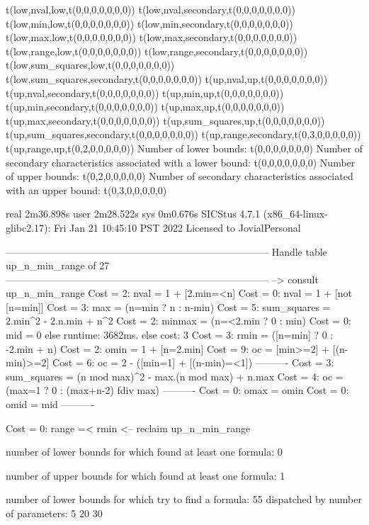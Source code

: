 t(low,nval,low,t(0,0,0,0,0,0,0))
t(low,nval,secondary,t(0,0,0,0,0,0,0))
t(low,min,low,t(0,0,0,0,0,0,0))
t(low,min,secondary,t(0,0,0,0,0,0,0))
t(low,max,low,t(0,0,0,0,0,0,0))
t(low,max,secondary,t(0,0,0,0,0,0,0))
t(low,range,low,t(0,0,0,0,0,0,0))
t(low,range,secondary,t(0,0,0,0,0,0,0))
t(low,sum_squares,low,t(0,0,0,0,0,0,0))
t(low,sum_squares,secondary,t(0,0,0,0,0,0,0))
t(up,nval,up,t(0,0,0,0,0,0,0))
t(up,nval,secondary,t(0,0,0,0,0,0,0))
t(up,min,up,t(0,0,0,0,0,0,0))
t(up,min,secondary,t(0,0,0,0,0,0,0))
t(up,max,up,t(0,0,0,0,0,0,0))
t(up,max,secondary,t(0,0,0,0,0,0,0))
t(up,sum_squares,up,t(0,0,0,0,0,0,0))
t(up,sum_squares,secondary,t(0,0,0,0,0,0,0))
t(up,range,secondary,t(0,3,0,0,0,0,0))
t(up,range,up,t(0,2,0,0,0,0,0))
Number of lower bounds:                                             t(0,0,0,0,0,0,0)
Number of secondary characteristics associated with a lower bound:  t(0,0,0,0,0,0,0)
Number of upper bounds:                                             t(0,2,0,0,0,0,0)
Number of secondary characteristics associated with an upper bound: t(0,3,0,0,0,0,0)

real	2m36.898s
user	2m28.522s
sys	0m0.676s
SICStus 4.7.1 (x86_64-linux-glibc2.17): Fri Jan 21 10:45:10 PST 2022
Licensed to JovialPersonal


--------------------------------------------------------------------------------
Handle table up_n_min_range of 27
--------------------------------------------------------------------------------
--> consult up_n_min_range
Cost =  2:  nval        = 1 + [2.min=<n]
Cost =  0:  nval        = 1 + [not [n=min]]
Cost =  3:  max         = (n=min ? n : n-min)
Cost =  5:  sum_squares = 2.min^2 - 2.n.min + n^2
Cost =  2:  minmax      = (n=<2.min ? 0 : min)
Cost =  0:  mid         = 0
else runtime: 3682ms. else cost: 3
Cost =  3:  rmin        = ([n=min] ? 0 : -2.min + n) %
Cost =  2:  omin        = 1 + [n=2.min]
Cost =  9:  oc          = [min>=2] + [(n-min)>=2]
Cost =  6:  oc          = 2 - ([min=1] + [(n-min)=<1])
----------
Cost =  3:  sum_squares = (n mod max)^2 - max.(n mod max) + n.max
Cost =  4:  oc          = (max=1 ? 0 : (max+n-2) fdiv max)
----------
Cost =  0:  omax        = omin
Cost =  0:  omid        = mid
----------

Cost =  0:  range =< rmin
<-- reclaim up_n_min_range

number of lower bounds for which found at least one formula: 0

number of upper bounds for which found at least one formula: 1

number of lower bounds for which try to find a formula: 55
dispatched by number of parameters: 5  20  30

